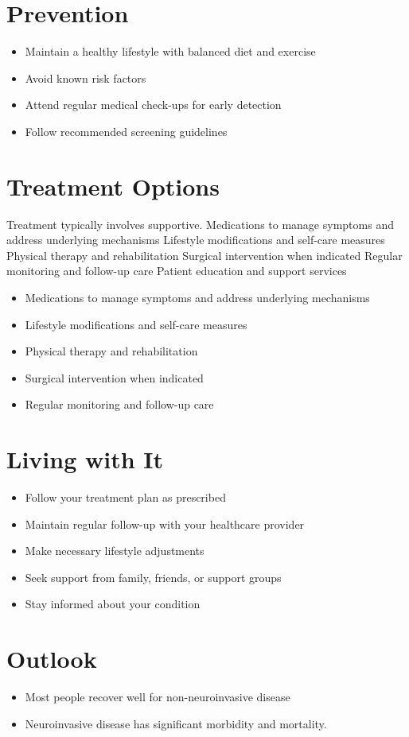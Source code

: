 \section{Prevention}
\begin{itemize}[noitemsep]
  \item Maintain a healthy lifestyle with balanced diet and exercise
  \item Avoid known risk factors
  \item Attend regular medical check-ups for early detection
  \item Follow recommended screening guidelines
\end{itemize}
\section{Treatment Options}
Treatment typically involves supportive. Medications to manage symptoms and address underlying mechanisms Lifestyle modifications and self-care measures Physical therapy and rehabilitation Surgical intervention when indicated Regular monitoring and follow-up care Patient education and support services

\begin{itemize}[noitemsep]
  \item Medications to manage symptoms and address underlying mechanisms
  \item Lifestyle modifications and self-care measures
  \item Physical therapy and rehabilitation
  \item Surgical intervention when indicated
  \item Regular monitoring and follow-up care
\end{itemize}
\section{Living with It}
\begin{itemize}[noitemsep]
  \item Follow your treatment plan as prescribed
  \item Maintain regular follow-up with your healthcare provider
  \item Make necessary lifestyle adjustments
  \item Seek support from family, friends, or support groups
  \item Stay informed about your condition
\end{itemize}
\section{Outlook}
\begin{itemize}[noitemsep]
  \item Most people recover well for non-neuroinvasive disease
  \item Neuroinvasive disease has significant morbidity and mortality.
\end{itemize}
